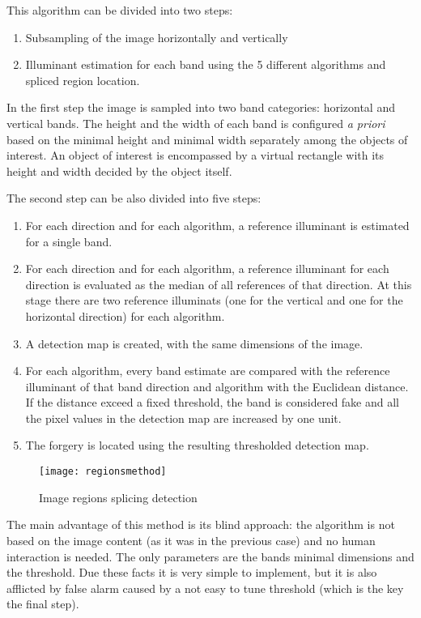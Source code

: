 This algorithm can be divided into two steps:
\begin{enumerate}
\item Subsampling of the image horizontally and vertically
\item Illuminant estimation for each band using the 5 different algorithms and spliced region location.
\end{enumerate}

In the first step the image is sampled into two band categories: horizontal and vertical bands. The height and the width of each band is configured \emph{a priori} based on the minimal height and minimal width separately among the objects of interest. An object of interest is encompassed by a virtual rectangle with its height and width decided by the object itself.

The second step can be also divided into five steps:

\begin{enumerate}
\item For each direction and for each algorithm, a reference illuminant is estimated for a single band.
\item For each direction and for each algorithm, a reference illuminant for each direction is evaluated as the median of all references of that direction. At this stage there are two reference illuminats (one for the vertical and one for the horizontal direction) for each algorithm.
\item A detection map is created, with the same dimensions of the image.
\item For each algorithm, every band estimate are compared with the reference illuminant of that band direction and algorithm with the Euclidean distance. If the distance exceed a fixed threshold, the band is considered fake and all the pixel values in the detection map are increased by one unit.
\item The forgery is located using the resulting thresholded detection map.
\end{enumerate}

\begin{figure}[h!]
  \centering
    \texttt{[image: regionsmethod]}
    \caption{Image regions splicing detection}
    \label{fig:regionsmethod}
\end{figure}

The main advantage of this method is its blind approach: the algorithm is not based on the image content (as it was in the previous case) and no human interaction is needed. The only parameters are the bands minimal dimensions and the threshold. Due these facts it is very simple to implement, but it is also afflicted by false alarm caused by a not easy to tune threshold (which is the key the final step).

